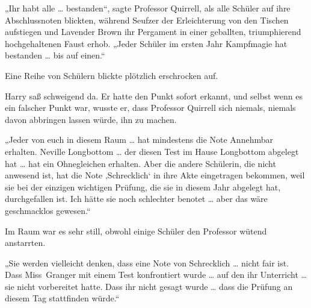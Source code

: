 „Ihr habt alle … bestanden“, sagte Professor Quirrell, als alle Schüler auf ihre Abschlussnoten blickten, während Seufzer der Erleichterung von den Tischen aufstiegen und Lavender Brown ihr Pergament in einer geballten, triumphierend hochgehaltenen Faust erhob.
„Jeder Schüler im ersten Jahr Kampfmagie hat bestanden … bis auf einen.“

Eine Reihe von Schülern blickte plötzlich erschrocken auf.

Harry saß schweigend da. Er hatte den Punkt sofort erkannt, und selbst wenn es ein falscher Punkt war, wusste er, dass Professor Quirrell sich niemals, niemals davon abbringen lassen würde, ihn zu machen.

„Jeder von euch in diesem Raum … hat mindestens die Note Annehmbar erhalten. Neville Longbottom … der diesen Test im Hause Longbottom abgelegt hat … hat ein Ohnegleichen erhalten. Aber die andere Schülerin, die nicht anwesend ist, hat die Note ‚Schrecklich‘ in ihre Akte eingetragen bekommen, weil sie bei der einzigen wichtigen Prüfung, die sie in diesem Jahr abgelegt hat, durchgefallen ist. Ich hätte sie noch schlechter benotet … aber das wäre geschmacklos gewesen.“

Im Raum war es sehr still, obwohl einige Schüler den Professor wütend anstarrten.

„Sie werden vielleicht denken, dass eine Note von Schrecklich … nicht fair ist. Dass Miss~Granger mit einem Test konfrontiert wurde … auf den ihr Unterricht … sie nicht vorbereitet hatte. Dass ihr nicht gesagt wurde … dass die Prüfung an diesem Tag stattfinden würde.“

